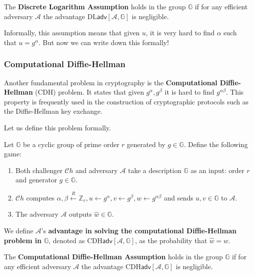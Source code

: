 \documentclass[../lecture-notes.tex]{subfiles}
\begin{document}
\begin{definition}
    The \textbf{Discrete Logarithm Assumption} holds in the group $\mathbb{G}$ if for any efficient adversary $\mathcal{A}$ the advantage $\text{DL}\mathsf{adv}[\mathcal{A},\mathbb{G}]$ is negligible.
\end{definition}

Informally, this assumption means that given $u$, it is very hard to find $\alpha$ such that $u = g^{\alpha}$. But now we can write down this formally!

\subsubsection{Computational Diffie-Hellman}

Another fundamental problem in cryptography is the \textbf{Computational Diffie-Hellman} (CDH) problem. It states that given $g^{\alpha},g^{\beta}$ it is hard to find $g^{\alpha\beta}$. This property is frequently used in the construction of cryptographic protocols such as the Diffie-Hellman key exchange.

Let us define this problem formally.

\begin{definition}
    Let $\mathbb{G}$ be a cyclic group of prime order $r$ generated by $g \in \mathbb{G}$. Define the following game:
    \begin{enumerate}
        \item Both challenger $\mathcal{C}h$ and adversary $\mathcal{A}$ take a description $\mathbb{G}$ as an input: order $r$ and generator $g \in \mathbb{G}$.
        \item $\mathcal{C}h$ computes $\alpha, \beta \xleftarrow{R} \mathbb{Z}_r, u \gets g^{\alpha}, v \gets g^{\beta}, w \gets g^{\alpha\beta}$ and sends $u,v \in \mathbb{G}$ to $\mathcal{A}$.
        \item The adversary $\mathcal{A}$ outputs $\hat{w} \in \mathbb{G}$.
    \end{enumerate}

    We define $\mathcal{A}$'s \textbf{advantage in solving the computational Diffie-Hellman problem in $\mathbb{G}$}, denoted as $\text{CDH}\mathsf{adv}[\mathcal{A},\mathbb{G}]$, as the probability that $\hat{w} = w$.
\end{definition}

\begin{definition}
    The \textbf{Computational Diffie-Hellman Assumption} holds in the group $\mathbb{G}$ if for any efficient adversary $\mathcal{A}$ the advantage $\text{CDH}\mathsf{adv}[\mathcal{A},\mathbb{G}]$ is negligible.
\end{definition}
\end{document}
